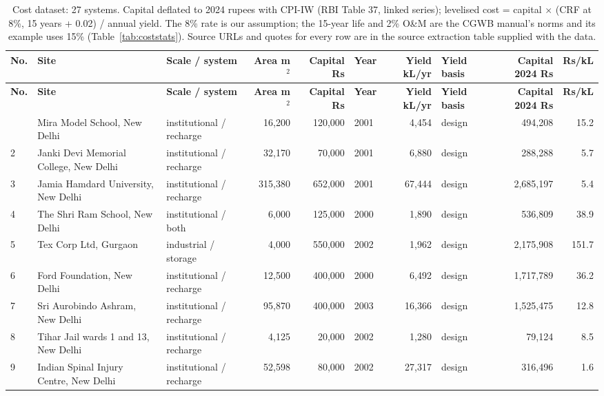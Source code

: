 {\scriptsize\setlength{\tabcolsep}{3pt}
\begin{longtable}{l p{3.2cm} p{2.3cm} r r l r p{1.6cm} r r}
\caption{Cost dataset: 27 systems. Capital deflated to 2024 rupees with CPI-IW (RBI Table 37, linked series); levelised cost = capital $\times$ (CRF at 8\%, 15 years + 0.02) / annual yield. The 8\% rate is our assumption; the 15-year life and 2\% O\&M are the CGWB manual's norms and its example uses 15\% (Table~\ref{tab:coststats}). Source URLs and quotes for every row are in the source extraction table supplied with the data.}\label{tab:cost}\\
\toprule
\textbf{No.} & \textbf{Site} & \textbf{Scale / system} & \textbf{Area m$^2$} & \textbf{Capital Rs} & \textbf{Year} & \textbf{Yield kL/yr} & \textbf{Yield basis} & \textbf{Capital 2024 Rs} & \textbf{Rs/kL}\\ \midrule\endfirsthead
\toprule \textbf{No.} & \textbf{Site} & \textbf{Scale / system} & \textbf{Area m$^2$} & \textbf{Capital Rs} & \textbf{Year} & \textbf{Yield kL/yr} & \textbf{Yield basis} & \textbf{Capital 2024 Rs} & \textbf{Rs/kL}\\ \midrule\endhead
\bottomrule\endfoot
1 & Mira Model School, New Delhi & institutional / recharge & 16,200 & 120,000 & 2001 & 4,454 & design & 494,208 & 15.2\\
2 & Janki Devi Memorial College, New Delhi & institutional / recharge & 32,170 & 70,000 & 2001 & 6,880 & design & 288,288 & 5.7\\
3 & Jamia Hamdard University, New Delhi & institutional / recharge & 315,380 & 652,000 & 2001 & 67,444 & design & 2,685,197 & 5.4\\
4 & The Shri Ram School, New Delhi & institutional / both & 6,000 & 125,000 & 2000 & 1,890 & design & 536,809 & 38.9\\
5 & Tex Corp Ltd, Gurgaon & industrial / storage & 4,000 & 550,000 & 2002 & 1,962 & design & 2,175,908 & 151.7\\
6 & Ford Foundation, New Delhi & institutional / recharge & 12,500 & 400,000 & 2000 & 6,492 & design & 1,717,789 & 36.2\\
7 & Sri Aurobindo Ashram, New Delhi & institutional / recharge & 95,870 & 400,000 & 2003 & 16,366 & design & 1,525,475 & 12.8\\
8 & Tihar Jail wards 1 and 13, New Delhi & institutional / recharge & 4,125 & 20,000 & 2002 & 1,280 & design & 79,124 & 8.5\\
9 & Indian Spinal Injury Centre, New Delhi & institutional / recharge & 52,598 & 80,000 & 2002 & 27,317 & design & 316,496 & 1.6\\

\end{longtable}}

